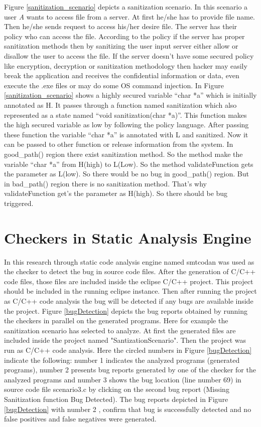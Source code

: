  Figure \ref{sanitization_scenario} depicts a sanitization scenario. In this scenario a user \emph{A} wants to access file from a server. At first he/she has to provide file name. Then he/she sends request to access his/her desire file. The server has their policy who can access the file. According to the policy if the server has proper sanitization methods then by sanitizing the user input server either allow or disallow the user to access the file. If the server doesn't have some secured policy like encryption, decryption or sanitization methodology then hacker may easily break the application and receives the confidential information or data, even execute the .exe files or may do some OS command injection. In Figure \ref{sanitization_scenario} shows a highly secured variable \enquote{char *a} which is initially annotated as H. It passes through a function named sanitization which also represented as a state named \enquote{void sanitization(char *a)}. This function makes the high secured variable as low by following the policy language. After passing these function the variable \enquote{char *a} is annotated with L and sanitized. Now it can be passed to other function or release information from the system. In good\_path() region there exist sanitization method. So the method make the variable \enquote{char *a} from H(high) to L(Low). So the method validateFunction gets the parameter as L(low). So there would be no bug in good\_path() region. But in bad\_path() region there is no sanitization method. That's why validateFunction get's the parameter as H(high). So there should be bug triggered.



\section{Checkers in Static Analysis Engine}

In this research through static code analysis engine named smtcodan was used as the checker to detect the bug in source code files. After the generation of C/C++ code files, those files are included inside the eclipse C/C++ project. This project should be included in the running eclipse instance. Then after running the project as C/C++ code analysis the bug will be detected if any bugs are available inside the project. Figure \ref{bugDetection} depicts the bug reports obtained by running the checkers in parallel on the generated programs. Here for example the sanitization scenario has selected to analyze. At first the generated files are included inside the project named "SantizationScenario". Then the project was run as C/C++ code analysis. Here the circled numbers in Figure \ref{bugDetection} indicate the following: number 1 indicates the analyzed programs (generated programs), number
2 presents bug reports generated by one of the checker for the analyzed programs and number 3 shows the
bug location (line number 69) in source code file scenario3.c by
clicking on the second bug report (Missing Sanitization function Bug
Detected). The bug reports depicted in Figure \ref{bugDetection} with number
2 , confirm that bug is successfully detected and no
false positives and false negatives were generated.

